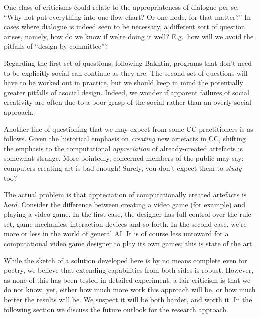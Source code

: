 One class of criticisms could relate to the appropriateness of
dialogue per se: ``Why not put everything into one flow chart?  Or one
node, for that matter?''  In cases where dialogue is indeed seen to be
necessary, a different sort of question arises, namely, how do we know
if we're doing it well?  E.g.~how will we avoid the pitfalls of
``design by committee''?

Regarding the first set of questions, following Bakhtin, programs that
don't need to be explicitly social can continue as they are.  The
second set of questions will have to be worked out in practice, but we
should keep in mind the potentially greater pitfalls of asocial
design.  Indeed, we wonder if apparent failures of social creativity
are often due to a poor grasp of the social rather than an overly
social approach.

Another line of questioning that we may expect from some CC
practitioners is as follows.  Given the historical emphasis on
\emph{creating} new artefacts in CC, shifting the emphasis to the
computational \emph{appreciation} of already-created artefacts is
somewhat strange.  More pointedly, concerned members of the public may
say: computers creating art is bad enough!  Surely, you don't expect
them to \emph{study} too?


The actual problem is that appreciation of computationally created
artefacts is \emph{hard}.  Consider the difference between creating a
video game (for example) and playing a video game.  In the first case,
the designer has full control over the rule-set, game mechanics,
interaction devices and so forth.  In the second case, we're more or
less in the world of general AI.  It is of course less untoward for a
computational video game designer to play its own games; this is state
of the art.

While the sketch of a solution developed here is by no means complete
even for poetry, we believe that extending capabilities from both
sides is robust.  However, as none of this has been tested in detailed
experiment, a fair criticism is that we do not know, yet, either how
much more work this approach will be, or how much better the results
will be.  We suspect it will be both harder, and worth it.  In the
following section we discuss the future outlook for the research approach.

